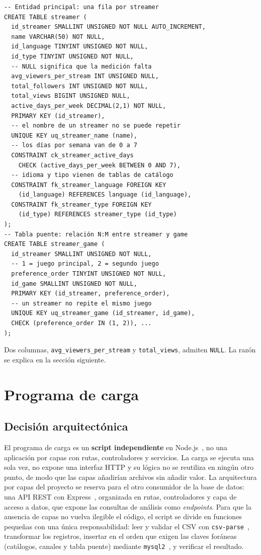 \documentclass[conference]{IEEEtran}
\begin{document}
\begin{lstlisting}
-- Entidad principal: una fila por streamer
CREATE TABLE streamer (
  id_streamer SMALLINT UNSIGNED NOT NULL AUTO_INCREMENT,
  name VARCHAR(50) NOT NULL,
  id_language TINYINT UNSIGNED NOT NULL,
  id_type TINYINT UNSIGNED NOT NULL,
  -- NULL significa que la medición falta
  avg_viewers_per_stream INT UNSIGNED NULL,
  total_followers INT UNSIGNED NOT NULL,
  total_views BIGINT UNSIGNED NULL,
  active_days_per_week DECIMAL(2,1) NOT NULL,
  PRIMARY KEY (id_streamer),
  -- el nombre de un streamer no se puede repetir
  UNIQUE KEY uq_streamer_name (name),
  -- los días por semana van de 0 a 7
  CONSTRAINT ck_streamer_active_days
    CHECK (active_days_per_week BETWEEN 0 AND 7),
  -- idioma y tipo vienen de tablas de catálogo
  CONSTRAINT fk_streamer_language FOREIGN KEY
    (id_language) REFERENCES language (id_language),
  CONSTRAINT fk_streamer_type FOREIGN KEY
    (id_type) REFERENCES streamer_type (id_type)
);
-- Tabla puente: relación N:M entre streamer y game
CREATE TABLE streamer_game (
  id_streamer SMALLINT UNSIGNED NOT NULL,
  -- 1 = juego principal, 2 = segundo juego
  preference_order TINYINT UNSIGNED NOT NULL,
  id_game SMALLINT UNSIGNED NOT NULL,
  PRIMARY KEY (id_streamer, preference_order),
  -- un streamer no repite el mismo juego
  UNIQUE KEY uq_streamer_game (id_streamer, id_game),
  CHECK (preference_order IN (1, 2)), ...
);
\end{lstlisting}

Dos columnas, \texttt{avg\_viewers\_per\_stream} y \texttt{total\_views}, admiten \texttt{NULL}. La razón se explica en la sección siguiente.

\section{Programa de carga}
\subsection{Decisión arquitectónica}
El programa de carga es un \textbf{script independiente} en Node.js~\cite{nodejs}, no una aplicación por capas con rutas, controladores y servicios. La carga se ejecuta una sola vez, no expone una interfaz HTTP y su lógica no se reutiliza en ningún otro punto, de modo que las capas añadirían archivos sin añadir valor. La arquitectura por capas del proyecto se reserva para el otro consumidor de la base de datos: una API REST con Express~\cite{express}, organizada en rutas, controladores y capa de acceso a datos, que expone las consultas de análisis como \emph{endpoints}. Para que la ausencia de capas no vuelva ilegible el código, el script se divide en funciones pequeñas con una única responsabilidad: leer y validar el CSV con \texttt{csv-parse}~\cite{csvparse}, transformar los registros, insertar en el orden que exigen las claves foráneas (catálogos, canales y tabla puente) mediante \texttt{mysql2}~\cite{mysql2}, y verificar el resultado.
\end{document}
